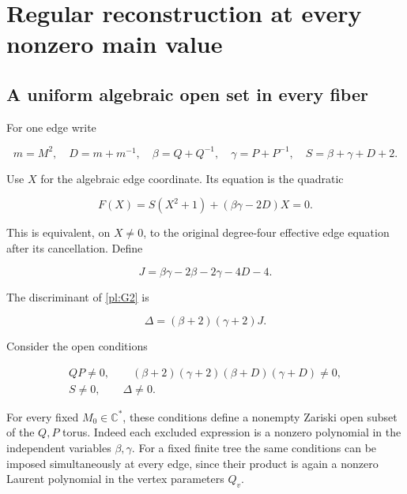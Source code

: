 \section{Regular reconstruction at every nonzero main value}\label{pl:regular-reconstruction-at-every-nonzero-main-value}

\subsection{A uniform algebraic open set in every fiber}\label{pl:a-uniform-algebraic-open-set-in-every-fiber}

For one edge write

\begin{equation}\label{pl:G1}
m=M^2,\quad D=m+m^{-1},\quad
 \beta=Q+Q^{-1},\quad\gamma=P+P^{-1},\quad
 S=\beta+\gamma+D+2.
\end{equation}

Use \(X\) for the algebraic edge coordinate. Its equation is the
quadratic

\begin{equation}\label{pl:G2}
F(X)=S(X^2+1)+(\beta\gamma-2D)X=0.
\end{equation}

This is equivalent, on \(X\ne0\), to the original degree-four
effective edge equation after its cancellation. Define

\begin{equation}\label{pl:G3}
J=\beta\gamma-2\beta-2\gamma-4D-4.
\end{equation}

The discriminant of \eqref{pl:G2} is

\begin{equation}\label{pl:G4}
\Delta=(\beta+2)(\gamma+2)J.
\end{equation}

Consider the open conditions

\begin{equation}\label{pl:G5}
\begin{gathered}
 QP\ne0,\qquad
 (\beta+2)(\gamma+2)(\beta+D)(\gamma+D)\ne0,\\
 S\ne0,\qquad \Delta\ne0.
\end{gathered}
\end{equation}

For every fixed \(M_0\in\mathbb C^*\), these conditions define
a nonempty Zariski open subset of the \(Q,P\) torus. Indeed each
excluded expression is a nonzero polynomial in the independent
variables \(\beta,\gamma\). For a fixed finite tree the same
conditions can be imposed simultaneously at every edge, since
their product is again a nonzero Laurent polynomial in the
vertex parameters \(Q_v\).


